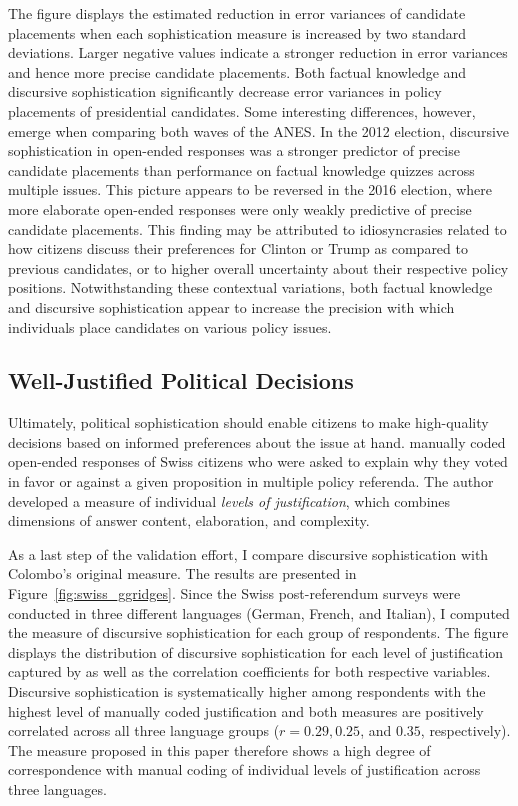 The figure displays the estimated reduction in error variances of candidate placements when each sophistication measure is increased by two standard deviations. Larger negative values indicate a stronger reduction in error variances and hence more precise candidate placements. Both factual knowledge and discursive sophistication significantly decrease error variances in policy placements of presidential candidates. Some interesting differences, however, emerge when comparing both waves of the ANES. In the 2012 election, discursive sophistication in open-ended responses was a stronger predictor of precise candidate placements than performance on factual knowledge quizzes across multiple issues. This picture appears to be reversed in the 2016 election, where more elaborate open-ended responses were only weakly predictive of precise candidate placements. This finding may be attributed to idiosyncrasies related to how citizens discuss their preferences for Clinton or Trump as compared to previous candidates, or to higher overall uncertainty about their respective policy positions. Notwithstanding these contextual variations, both factual knowledge and discursive sophistication appear to increase the precision with which individuals place candidates on various policy issues.


\subsection*{Well-Justified Political Decisions}
Ultimately, political sophistication should enable citizens to make high-quality decisions based on informed preferences about the issue at hand. \citet{colombo2016justifications} manually coded open-ended responses of Swiss citizens who were asked to explain why they voted in favor or against a given proposition in multiple policy referenda. The author developed a measure of individual \textit{levels of justification}, which combines dimensions of answer content, elaboration, and complexity.

As a last step of the validation effort, I compare discursive sophistication with Colombo's \citeyearpar{colombo2016justifications} original measure. The results are presented in Figure~\ref{fig:swiss_ggridges}. Since the Swiss post-referendum surveys were conducted in three different languages (German, French, and Italian), I computed the measure of discursive sophistication for each group of respondents. The figure displays the distribution of discursive sophistication for each level of justification captured by \citet{colombo2016justifications} as well as the correlation coefficients for both respective variables. Discursive sophistication is systematically higher among respondents with the highest level of manually coded justification and both measures are positively correlated across all three language groups ($r=0.29, 0.25$, and $0.35$, respectively). The measure proposed in this paper therefore shows a high degree of correspondence with manual coding of individual levels of justification across three languages.


